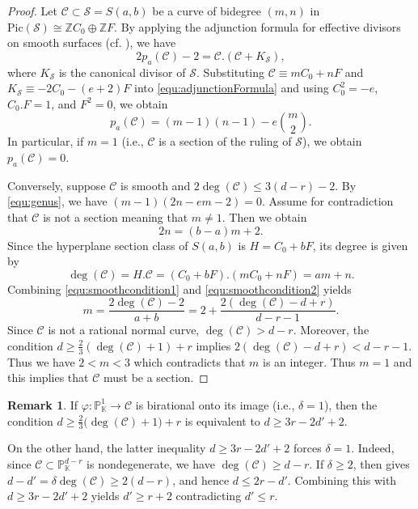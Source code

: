 \documentclass[a4paper, 11pt]{amsart}
\numberwithin{theorem}{section}
\theoremstyle{definition}
\newtheorem{remark}[theorem]{Remark}
\numberwithin{equation}{section}
\begin{document}
\begin{proof}
Let $\mathcal{C} \subset \mathcal{S} = S(a,b)$ be a curve of bidegree $(m, n)$ in $\mathrm{Pic}(\mathcal{S}) \cong \mathbb{Z}C_0 \oplus \mathbb{Z}F$. 
By applying the adjunction formula for effective divisors on smooth surfaces (cf. \cite[Chapter V, Ex.~1.3]{hartshorne}), we have
\begin{equation}\label{equ:adjunctionFormula}
    2p_a(\mathcal{C}) - 2 = \mathcal{C}.(\mathcal{C} + K_{\mathcal{S}}),
\end{equation}
where $K_{\mathcal{S}}$ is the canonical divisor of $\mathcal{S}$. 
Substituting $\mathcal{C} \equiv mC_0 + nF$ and $K_{\mathcal{S}} \equiv -2C_0 - (e+2)F$ into \eqref{equ:adjunctionFormula} and using $C_0^2 = -e$, $C_0.F = 1$, and $F^2 = 0$, we obtain
\begin{equation}\label{equ:genus}
  p_a(\mathcal{C}) = (m-1)(n-1) - e\binom{m}{2}.  
\end{equation}
In particular, if $m = 1$ (i.e., $\mathcal{C}$ is a section of the ruling of $\mathcal{S}$), we obtain $p_a(\mathcal{C}) = 0$.

Conversely, suppose $\mathcal{C}$ is smooth and $2\deg(\mathcal{C}) \leq 3(d-r)-2$.
By \eqref{equ:genus}, we have $(m-1)(2n-em-2) = 0$.
Assume for contradiction that $\mathcal{C}$ is not a section meaning that $m \neq 1$. 
Then we obtain
\begin{equation}\label{equ:smoothcondition1}
    2n = (b-a)m+2.
\end{equation}
Since the hyperplane section class of $S(a,b)$ is $H = C_0+bF$, its degree is given by 
\begin{equation}\label{equ:smoothcondition2}
\deg(\mathcal{C}) = H.\mathcal{C} = (C_0+bF).(mC_0+nF) = am+n. 
\end{equation}
Combining \eqref{equ:smoothcondition1} and \eqref{equ:smoothcondition2} yields 
\[
m = \frac{2\deg(\mathcal{C})-2}{a+b} = 2+\frac{2(\deg(\mathcal{C})-d+r)}{d-r-1}.
\]
Since $\mathcal{C}$ is not a rational normal curve, $\deg(\mathcal{C}) > d-r$.
Moreover, the condition $d\geq \frac{2}{3}(\deg(\mathcal{C})+1) +r$ implies $2(\deg(\mathcal{C})-d+r)<d-r-1$.
Thus we have $2 < m < 3$ which contradicts that $m$ is an integer. 
Thus $m = 1$ and this implies that $\mathcal{C}$ must be a section.
\end{proof}
\begin{remark}\label{rem:delta1Cond}
If $\varphi:\mathbb{P}_{\mathbb{K}}^1\longrightarrow \mathcal{C}$ is birational onto its image (i.e., $\delta=1$), then the condition $d\geq \frac{2}{3}\bigl(\deg(\mathcal{C})+1\bigr)+r$ is equivalent to $d\geq 3r-2d'+2$.

On the other hand, the latter inequality $d\geq 3r-2d'+2$ forces $\delta=1$.
Indeed, since $\mathcal{C}\subset\mathbb{P}_{\mathbb{K}}^{d-r}$ is nondegenerate, we have $\deg(\mathcal{C})\geq d-r$. 
If $\delta\geq2$, then  gives $d-d'=\delta\deg(\mathcal{C})\geq2(d-r)$, and hence $d\leq2r-d'$.
Combining this with $d\geq3r-2d'+2$ yields $d'\geq r+2$ contradicting $d'\leq r$.
\end{remark}
\end{document}

